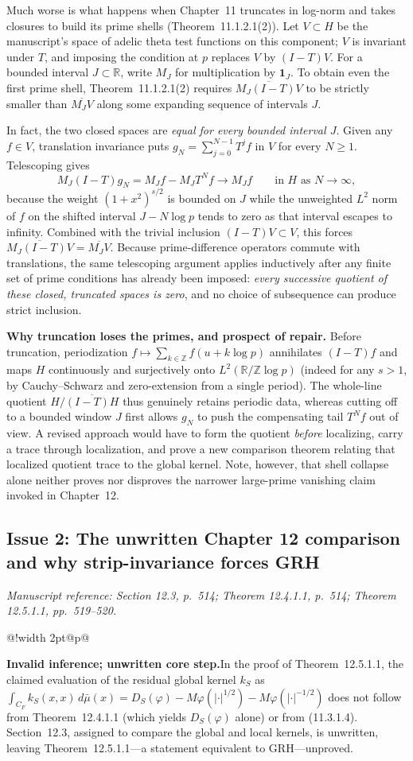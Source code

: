 \documentclass[11pt,letterpaper]{article}
\makeatletter
\newcommand{\msloc}[1]{%
  {\small\color{locgray}\itshape Manuscript reference: #1.}\par\nobreak\vspace{3pt}\@afterindentfalse\@afterheading
}
\newcommand{\issuefinding}[2]{%
  \begingroup
  \setlength{\fboxsep}{0pt}%
  \noindent\colorbox{barbg}{%
    \begin{tabular}{@{}!{\color{baraccent}\vrule width 2pt}@{\hspace{8pt}}p{\dimexpr\linewidth-18pt\relax}@{\hspace{8pt}}}
      \rule{0pt}{11.5pt}\small\textbf{\color{baraccent}#1}\enspace #2\rule[-4.5pt]{0pt}{0pt}
    \end{tabular}%
  }%
  \endgroup
  \par\nobreak\vspace{4.5pt}\@afterindentfalse\@afterheading
}
\newcommand{\R}{\mathbb{R}}
\newcommand{\Z}{\mathbb{Z}}
\newcommand{\dd}{\,d}
\makeatother
\begin{document}
Much worse is what happens when Chapter~11 truncates in log-norm and takes closures to build its prime shells (Theorem~11.1.2.1(2)). Let $V\subset H$ be the manuscript's space of adelic theta test functions on this component; $V$ is invariant under $T$, and imposing the condition at $p$ replaces $V$ by $(I-T)V$. For a bounded interval $J\subset\R$, write $M_J$ for multiplication by $\mathbf{1}_J$. To obtain even the first prime shell, Theorem~11.1.2.1(2) requires $\overline{M_J(I-T)V}$ to be strictly smaller than $\overline{M_J V}$ along some expanding sequence of intervals $J$.

In fact, the two closed spaces are \emph{equal for every bounded interval $J$}. Given any $f\in V$, translation invariance puts $g_N = \sum_{j=0}^{N-1} T^j f$ in $V$ for every $N\ge 1$. Telescoping gives
\[
  M_J(I - T)g_N = M_J f - M_J T^N f \longrightarrow M_J f \qquad \text{in } H \text{ as } N\to\infty,
\]
because the weight $(1+x^2)^{s/2}$ is bounded on $J$ while the unweighted $L^2$ norm of $f$ on the shifted interval $J - N\log p$ tends to zero as that interval escapes to infinity. Combined with the trivial inclusion $(I-T)V\subset V$, this forces $\overline{M_J(I-T)V} = \overline{M_J V}$. Because prime-difference operators commute with translations, the same telescoping argument applies inductively after any finite set of prime conditions has already been imposed: \emph{every successive quotient of these closed, truncated spaces is zero}, and no choice of subsequence can produce strict inclusion.

\textbf{Why truncation loses the primes, and prospect of repair.} Before truncation, periodization $f\mapsto \sum_{k\in\Z} f(u+k\log p)$ annihilates $(I-T)f$ and maps $H$ continuously and surjectively onto $L^2(\R/\Z\log p)$ (indeed for any $s>1$, by Cauchy--Schwarz and zero-extension from a single period). The whole-line quotient $H/\overline{(I-T)H}$ thus genuinely retains periodic data, whereas cutting off to a bounded window $J$ first allows $g_N$ to push the compensating tail $T^N f$ out of view. A revised approach would have to form the quotient \emph{before} localizing, carry a trace through localization, and prove a new comparison theorem relating that localized quotient trace to the global kernel. Note, however, that shell collapse alone neither proves nor disproves the narrower large-prime vanishing claim invoked in Chapter~12.

\subsection{Issue 2: The unwritten Chapter 12 comparison and why strip-invariance forces GRH}
\msloc{Section 12.3, p.~514; Theorem 12.4.1.1, p.~514; Theorem 12.5.1.1, pp.~519--520}
\issuefinding{Invalid inference; unwritten core step.}{In the proof of Theorem~12.5.1.1, the claimed evaluation of the residual global kernel $k_S$ as $\int_{C_F} k_S(x,x)\dd\bar\mu(x) = D_S(\varphi) - M\varphi(|\cdot|^{1/2}) - M\varphi(|\cdot|^{-1/2})$ does not follow from Theorem~12.4.1.1 (which yields $D_S(\varphi)$ alone) or from (11.3.1.4). Section~12.3, assigned to compare the global and local kernels, is unwritten, leaving Theorem~12.5.1.1---a statement equivalent to GRH---unproved.}
\end{document}
